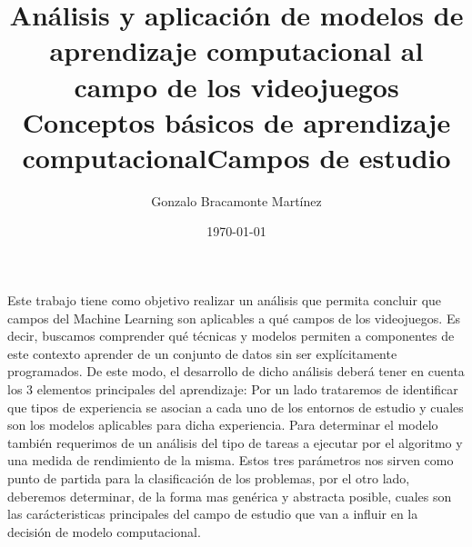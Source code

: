 \documentclass[a4paper,12pt]{article}
\begin{document}
\title{Análisis y aplicación de modelos de aprendizaje computacional al campo de los videojuegos }
\author{Gonzalo Bracamonte Martínez}
\date{\today}
\maketitle



\title{Conceptos básicos de aprendizaje computacional}

Este trabajo tiene como objetivo realizar un análisis que permita concluir que campos del Machine Learning son aplicables a qué campos de los videojuegos. Es decir, buscamos comprender qué técnicas y modelos permiten a componentes de este contexto aprender de un conjunto de datos sin ser explícitamente programados. De este modo, el desarrollo de dicho análisis deberá tener en cuenta los 3 elementos principales del aprendizaje: Por un lado trataremos de identificar que tipos de experiencia se asocian a cada uno de los entornos de estudio y cuales son los modelos aplicables para dicha experiencia. Para determinar el modelo también requerimos de un análisis del tipo de tareas a ejecutar por el algoritmo y una medida de rendimiento de la misma. Estos tres parámetros nos sirven como punto de partida para la clasificación de los problemas, por el otro lado, deberemos determinar, de la forma mas genérica y abstracta posible, cuales son las carácteristicas principales del campo de estudio que van a influir en la decisión de modelo computacional.

\title{Campos de estudio}
\end{document}
